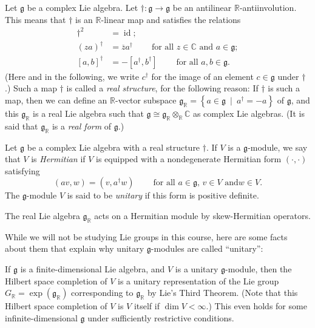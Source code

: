\documentclass[etingof-lie.tex]{subfiles}
\begin{document}
\begin{definition}
Let $\mathfrak{g}$ be a complex Lie algebra. Let $\dag:\mathfrak{g}%
\rightarrow\mathfrak{g}$ be an antilinear $\mathbb{R}$-antiinvolution. This
means that $\dag$ is an $\mathbb{R}$-linear map and satisfies the relations%
\begin{align*}
\dag^{2}  &  =\operatorname*{id};\\
\left(  za\right)  ^{\dag}  &  =\overline{z}a^{\dag}%
\ \ \ \ \ \ \ \ \ \ \text{for all }z\in\mathbb{C}\text{ and }a\in
\mathfrak{g};\\
\left[  a,b\right]  ^{\dag}  &  =-\left[  a^{\dag},b^{\dag}\right]
\ \ \ \ \ \ \ \ \ \ \text{for all }a,b\in\mathfrak{g}.
\end{align*}
(Here and in the following, we write $c^{\dag}$ for the image of an element
$c\in\mathfrak{g}$ under $\dag$.) Such a map $\dag$ is called a \textit{real
structure}, for the following reason: If $\dag$ is such a map, then we can
define an $\mathbb{R}$-vector subspace $\mathfrak{g}_{\mathbb{R}}=\left\{
a\in\mathfrak{g}\ \mid\ a^{\dag}=-a\right\}  $ of $\mathfrak{g}$, and this
$\mathfrak{g}_{\mathbb{R}}$ is a real Lie algebra such that $\mathfrak{g}%
\cong\mathfrak{g}_{\mathbb{R}}\otimes_{\mathbb{R}}\mathbb{C}$ as complex Lie
algebras. (It is said that $\mathfrak{g}_{\mathbb{R}}$ is a \textit{real form}
of $\mathfrak{g}$.)
\end{definition}

\begin{definition}
Let $\mathfrak{g}$ be a complex Lie algebra with a real structure $\dag$. If
$V$ is a $\mathfrak{g}$-module, we say that $V$ is \textit{Hermitian} if $V$
is equipped with a nondegenerate Hermitian form $\left(  \cdot,\cdot\right)  $
satisfying%
\[
\left(  av,w\right)  =\left(  v,a^{\dag}w\right)
\ \ \ \ \ \ \ \ \ \ \text{for all }a\in\mathfrak{g}\text{, }v\in V\text{ and
}w\in V.
\]
The $\mathfrak{g}$-module $V$ is said to be \textit{unitary} if this form is
positive definite.
\end{definition}

The real Lie algebra $\mathfrak{g}_{\mathbb{R}}$ acts on a Hermitian module by
skew-Hermitian operators.

\begin{remark}
While we will not be studying Lie groups in this course, here are some facts
about them that explain why unitary $\mathfrak{g}$-modules are called ``unitary'':

If $\mathfrak{g}$ is a finite-dimensional Lie algebra, and $V$ is a unitary
$\mathfrak{g}$-module, then the Hilbert space completion of $V$ is a unitary
representation of the Lie group $G_{\mathbb{R}}=\exp\left(  \mathfrak{g}%
_{\mathbb{R}}\right)  $ corresponding to $\mathfrak{g}_{\mathbb{R}}$ by Lie's
Third Theorem. (Note that this Hilbert space completion of $V$ is $V$ itself
if $\dim V<\infty$.) This even holds for some infinite-dimensional
$\mathfrak{g}$ under sufficiently restrictive conditions.
\end{remark}
\end{document}
